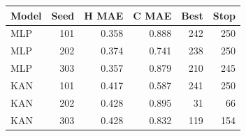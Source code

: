 \begin{center}
\small
\setlength{\tabcolsep}{4pt}
\begin{tabular}{@{}lrrrrr@{}}
\toprule
Model & Seed & H MAE & C MAE & Best & Stop\\
\midrule
MLP & 101 & 0.358 & 0.888 & 242 & 250\\
MLP & 202 & 0.374 & 0.741 & 238 & 250\\
MLP & 303 & 0.357 & 0.879 & 210 & 245\\
KAN & 101 & 0.417 & 0.587 & 241 & 250\\
KAN & 202 & 0.428 & 0.895 & 31 & 66\\
KAN & 303 & 0.428 & 0.832 & 119 & 154\\
\bottomrule
\end{tabular}
\end{center}